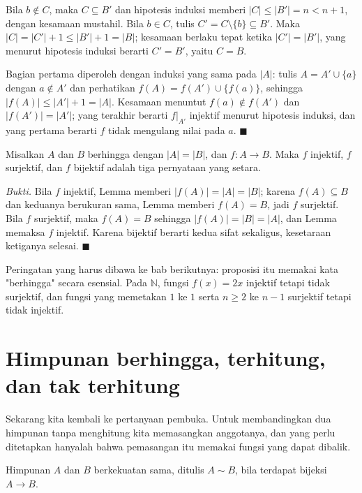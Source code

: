 Bila $b \notin C$, maka $C \subseteq B'$ dan hipotesis induksi memberi
$|C| \le |B'| = n < n+1$, dengan kesamaan mustahil. Bila $b \in C$, tulis
$C' = C \setminus \{b\} \subseteq B'$. Maka $|C| = |C'| + 1 \le |B'| + 1 = |B|$;
kesamaan berlaku tepat ketika $|C'| = |B'|$, yang menurut hipotesis induksi berarti
$C' = B'$, yaitu $C = B$.

Bagian pertama diperoleh dengan induksi yang sama pada $|A|$: tulis
$A = A' \cup \{a\}$ dengan $a \notin A'$ dan perhatikan
$f(A) = f(A') \cup \{f(a)\}$, sehingga $|f(A)| \le |A'| + 1 = |A|$. Kesamaan menuntut
$f(a) \notin f(A')$ dan $|f(A')| = |A'|$; yang terakhir berarti $f|_{A'}$ injektif
menurut hipotesis induksi, dan yang pertama berarti $f$ tidak mengulang nilai pada
$a$.
\hfill$\blacksquare${\parfillskip=0pt\par}

\begin{proposisi}
Misalkan $A$ dan $B$ berhingga dengan $|A| = |B|$, dan $f : A \to B$. Maka $f$
injektif, $f$ surjektif, dan $f$ bijektif adalah tiga pernyataan yang setara.
\end{proposisi}
\par\smallskip\noindent\textit{Bukti.} Bila $f$ injektif, Lemma memberi
$|f(A)| = |A| = |B|$; karena $f(A) \subseteq B$ dan keduanya berukuran sama, Lemma
memberi $f(A) = B$, jadi $f$ surjektif. Bila $f$ surjektif, maka $f(A) = B$ sehingga
$|f(A)| = |B| = |A|$, dan Lemma memaksa $f$ injektif. Karena bijektif berarti kedua
sifat sekaligus, kesetaraan ketiganya selesai.
\hfill$\blacksquare${\parfillskip=0pt\par}

Peringatan yang harus dibawa ke bab berikutnya: proposisi itu memakai kata
"berhingga" secara esensial. Pada $\mathbb{N}$, fungsi $f(x) = 2x$ injektif tetapi
tidak surjektif, dan fungsi yang memetakan $1$ ke $1$ serta $n \ge 2$ ke $n-1$
surjektif tetapi tidak injektif.

\section{Himpunan berhingga, terhitung, dan tak terhitung}

Sekarang kita kembali ke pertanyaan pembuka. Untuk membandingkan dua himpunan tanpa
menghitung kita memasangkan anggotanya, dan yang perlu ditetapkan hanyalah bahwa
pemasangan itu memakai fungsi yang dapat dibalik.

\begin{definisi}
Himpunan $A$ dan $B$ berkekuatan sama, ditulis $A \sim B$, bila terdapat bijeksi
$A \to B$.
\end{definisi}

